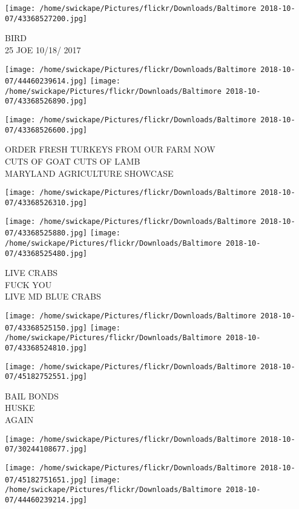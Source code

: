 \documentclass[10pt,letterpaper]{article}
\begin{document}
\vspace{0.25in}
\texttt{[image: /home/swickape/Pictures/flickr/Downloads/Baltimore 2018-10-07/43368527200.jpg]}

BIRD\\
25 JOE 10/18/ 2017\\
\pagebreak

\texttt{[image: /home/swickape/Pictures/flickr/Downloads/Baltimore 2018-10-07/44460239614.jpg]}
\texttt{[image: /home/swickape/Pictures/flickr/Downloads/Baltimore 2018-10-07/43368526890.jpg]}

\vspace{0.25in}
\texttt{[image: /home/swickape/Pictures/flickr/Downloads/Baltimore 2018-10-07/43368526600.jpg]}

ORDER FRESH TURKEYS FROM OUR FARM NOW\\
CUTS OF GOAT CUTS OF LAMB\\
MARYLAND AGRICULTURE SHOWCASE\\
\pagebreak

\texttt{[image: /home/swickape/Pictures/flickr/Downloads/Baltimore 2018-10-07/43368526310.jpg]}

\vspace{0.25in}
\texttt{[image: /home/swickape/Pictures/flickr/Downloads/Baltimore 2018-10-07/43368525880.jpg]}
\texttt{[image: /home/swickape/Pictures/flickr/Downloads/Baltimore 2018-10-07/43368525480.jpg]}

LIVE CRABS\\
FUCK YOU\\
LIVE MD BLUE CRABS\\
\pagebreak

\texttt{[image: /home/swickape/Pictures/flickr/Downloads/Baltimore 2018-10-07/43368525150.jpg]}
\texttt{[image: /home/swickape/Pictures/flickr/Downloads/Baltimore 2018-10-07/43368524810.jpg]}

\texttt{[image: /home/swickape/Pictures/flickr/Downloads/Baltimore 2018-10-07/45182752551.jpg]}

BAIL BONDS\\
HUSKE\\
AGAIN\\
\pagebreak

\texttt{[image: /home/swickape/Pictures/flickr/Downloads/Baltimore 2018-10-07/30244108677.jpg]}

\vspace{0.25in}
\texttt{[image: /home/swickape/Pictures/flickr/Downloads/Baltimore 2018-10-07/45182751651.jpg]}
\texttt{[image: /home/swickape/Pictures/flickr/Downloads/Baltimore 2018-10-07/44460239214.jpg]}
\end{document}
